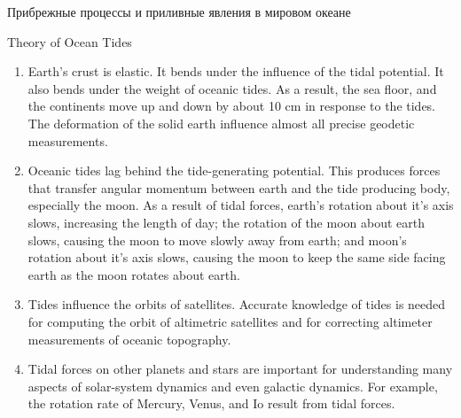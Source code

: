 \begin{chapter}{Прибрежные процессы и приливные явления в мировом океане}
\begin{section}{Theory of Ocean Tides}
\begin{enumerate}
\item 
Earth's crust is elastic. It bends under the influence of the tidal
potential. It also bends under the weight of oceanic tides. As a
result, the sea floor, and the continents move up and down by about 10
cm in response to the tides. The deformation of the solid earth
influence almost all precise geodetic measurements.
%

\item 
Oceanic tides lag behind the tide-generating potential. This produces
forces that transfer angular momentum between earth and the tide
produc\-ing body, especially the moon. As a result of
tidal forces, earth's rotation about it's axis slows, increasing the
length of day; the rotation of the moon about earth slows, causing the
moon to move slowly away from earth; and moon's rotation about it's
axis slows, causing the moon to keep the same side facing earth as the
moon rotates about earth.
%

\item 
Tides influence the orbits of satellites. Accurate knowledge of tides
is needed for computing the orbit of altimetric satellites and for
correcting altimeter measurements of oceanic topography.
%

\item 
Tidal forces on other planets and stars are important for
understanding many aspects of solar-system dynamics and even galactic
dynamics. For example, the rotation rate of Mercury, Venus, and Io
result from tidal forces.
%
\end{enumerate}


\end{section}
\end{chapter}

